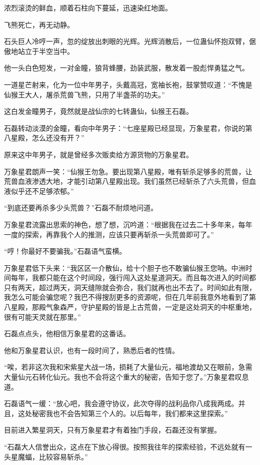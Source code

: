 \begin{this_body}
浓烈滚烫的鲜血，顺着石柱向下蔓延，迅速染红地面。

飞熊死亡，再无动静。

石头巨人冷哼一声，忽的绽放出刺眼的光辉。光辉消散后，一位蛊仙怀抱双臂，倨傲地站立于半空当中。

他一头白色短发，一对金瞳，狼背蜂腰，劲装武服，散发着一股彪悍勇猛之气。

一道星芒射来，化为一位中年男子，头戴高冠，宽袖长袍，鼓掌赞叹道：“不愧是仙猴王大人，屠杀荒兽飞熊，只用了半盏茶的功夫。”

这白发金瞳男子，竟然就是战仙宗的七转蛊仙，仙猴王石磊。

石磊转动淡漠的金瞳，看向中年男子：“七座星殿已经显现，万象星君，你说的第八星殿，怎么还没有开？”

原来这中年男子，就是曾经多次贩卖给方源货物的万象星君。

万象星君朗声一笑：“仙猴王勿急。要出现第八星殿，唯有斩杀足够多的荒兽，让荒兽血液渗透大地，才能引动第八星殿出现。我们虽然已经斩杀了六头荒兽，但血液似乎还不足够浓郁。”

“到底还要再杀多少头荒兽？”石磊不耐烦地问道。

万象星君流露出思索的神色，想了想，沉吟道：“根据我在过去二十多年来，每年一度的探索，再靠我个人的推测，应该只要再斩杀一头荒兽即可了。”

“哼！你最好不要骗我。”石磊语气蛮横。

万象星君低下头来：“我区区一介散仙，给十个胆子也不敢骗仙猴王您呐。中洲时间每年，我都只能在这个时间段，强行闯入这处星道洞天。而且每次进入的时间都只有两天，超过两天，洞天缝隙就会弥合，我们就再也出不去了。时间如此有限，我怎么可能会骗您呢？我巴不得搜刮更多的资源呢，但在几年前我意外地看到了第八星殿，那殿气象森严，守护星殿的皆是上古荒兽，一定是这处洞天的中枢重地，很有可能天灵就在那里。”

石磊点点头，他相信万象星君的这番话。

他和万象星君认识，也有一段时间了，熟悉后者的性情。

“唉，若非这次我和宋紫星大战一场，损耗了大量仙元，福地渡劫又在眼前，急需大量仙元石转化仙元。我也不会将这个重大的秘密，告知于您了。”万象星君叹息道。

石磊语气一缓：“放心吧，我会遵守协议，此次夺得的战利品你八成我两成。并且，这处秘密我也不会告知第三个人的。以后每年，我们都来这里探索。”

目前进入繁星洞天，只有万象星君才有着独门手段，石磊还没有掌握。

“石磊大人信誉出众，这点在下放心得很。按照我往年的探索经验，不远处就有一头星魔蝠，比较容易斩杀。”


\end{this_body}
